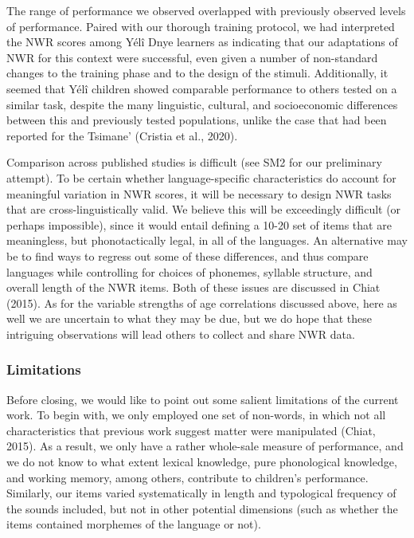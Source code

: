 \documentclass[
  american,
  ,man,floatsintext]{apa6}
\begin{document}
The range of performance we observed overlapped with previously observed levels of performance. Paired with our thorough training protocol, we had interpreted the NWR scores among Yélî Dnye learners as indicating that our adaptations of NWR for this context were successful, even given a number of non-standard changes to the training phase and to the design of the stimuli. Additionally, it seemed that Yélî children showed comparable performance to others tested on a similar task, despite the many linguistic, cultural, and socioeconomic differences between this and previously tested populations, unlike the case that had been reported for the Tsimane' (Cristia et al., 2020).

Comparison across published studies is difficult (see SM2 for our preliminary attempt). To be certain whether language-specific characteristics do account for meaningful variation in NWR scores, it will be necessary to design NWR tasks that are cross-linguistically valid. We believe this will be exceedingly difficult (or perhaps impossible), since it would entail defining a 10-20 set of items that are meaningless, but phonotactically legal, in all of the languages. An alternative may be to find ways to regress out some of these differences, and thus compare languages while controlling for choices of phonemes, syllable structure, and overall length of the NWR items. Both of these issues are discussed in Chiat (2015). As for the variable strengths of age correlations discussed above, here as well we are uncertain to what they may be due, but we do hope that these intriguing observations will lead others to collect and share NWR data.

\hypertarget{limitations}{%
\subsubsection{Limitations}\label{limitations}}

Before closing, we would like to point out some salient limitations of the current work. To begin with, we only employed one set of non-words, in which not all characteristics that previous work suggest matter were manipulated (Chiat, 2015). As a result, we only have a rather whole-sale measure of performance, and we do not know to what extent lexical knowledge, pure phonological knowledge, and working memory, among others, contribute to children's performance. Similarly, our items varied systematically in length and typological frequency of the sounds included, but not in other potential dimensions (such as whether the items contained morphemes of the language or not).
\end{document}
